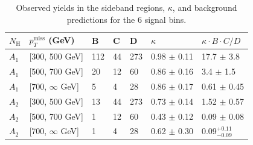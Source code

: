 \begin{table}[hb!]
\centering
\caption{
Observed yields in the sideband regions, $\kappa$, and background predictions for the 6 signal bins.
}
\begin{tabular}{lllllll}
\hline
\hline
$N_{\mathrm{H}}$ & $p_{T}^{\mathrm{miss}}$ (GeV) & B & C & D & $\kappa$  & $\kappa \cdot B \cdot C / D$ \\
\hline
$A_{1}$ & [300, 500 GeV]      & 112 & 44  & 273 & 0.98 $\pm$ 0.11 & 17.7 $\pm$ 3.8\\
$A_{1}$ & [500, 700 GeV]      & 20   & 12  & 60   & 0.86 $\pm$ 0.16 & 3.4  $\pm$ 1.5\\
$A_{1}$ & [700, $\infty$ GeV] & 5    & 4    & 28   & 0.86 $\pm$ 0.17 & 0.61 $\pm$ 0.45\\
$A_{2}$ & [300, 500 GeV]      & 13   & 44  & 273 & 0.73 $\pm$ 0.14 & 1.52 $\pm$ 0.57\\
$A_{2}$ & [500, 700 GeV]      & 1     & 12  & 60   & 0.43 $\pm$ 0.12 & 0.09 $\pm$ 0.08\\
$A_{2}$ & [700, $\infty$ GeV] & 1     & 4     & 28   & 0.62 $\pm$ 0.30 & 0.09$^{+0.11}_{-0.09}$\\
\hline
\hline
\end{tabular}
\label{tab:tab}
\end{table}

